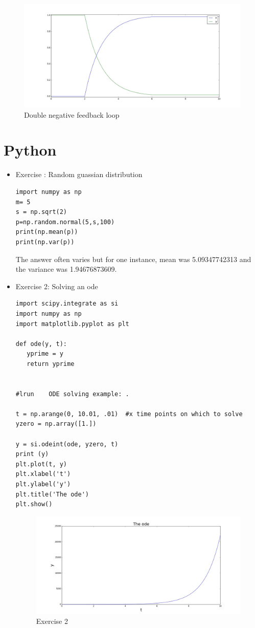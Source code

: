 \documentclass[a4paper]{article}
\begin{document}
 	   \begin{figure}[H]
 	   	\centering
 	   	\includegraphics[width=12cm]{motif2}
 	   	\caption{Double negative feedback loop}
 	   \end{figure} 		
\section{Python}
 \begin{itemize}
 	\item  Exercise : Random guassian distribution
 	\begin{lstlisting}[style=MyPythonstyle]
import numpy as np
m= 5
s = np.sqrt(2)
p=np.random.normal(5,s,100)
print(np.mean(p))
print(np.var(p))
 	\end{lstlisting}
 The answer often varies but for one instance, mean was 5.09347742313 and the variance was 1.94676873609.
 	\item Exercise 2: Solving an ode
 	\begin{lstlisting}[style=MyPythonstyle]
import scipy.integrate as si
import numpy as np
import matplotlib.pyplot as plt

def ode(y, t):
   yprime = y
   return yprime


#lrun    ODE solving example: .

t = np.arange(0, 10.01, .01)  #x time points on which to solve
yzero = np.array([1.])

y = si.odeint(ode, yzero, t)
print (y)
plt.plot(t, y)
plt.xlabel('t')
plt.ylabel('y')
plt.title('The ode')
plt.show()     	
 	\end{lstlisting} 
 	   \begin{figure}[H]
 	   	\centering
 	   	\includegraphics[width=12cm]{figure_1}
 	   	\caption{Exercise 2}
 	   \end{figure}	
 	\end{itemize}
 	
     
\end{document}
